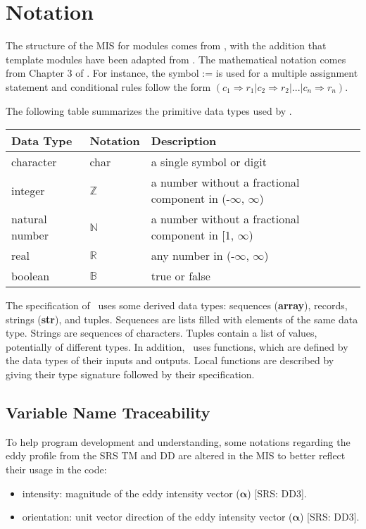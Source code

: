 \documentclass[12pt, titlepage]{article}
\begin{document}
\section{Notation}


The structure of the MIS for modules comes from \citet{HoffmanAndStrooper1995},
with the addition that template modules have been adapted from
\cite{GhezziEtAl2003}.  The mathematical notation comes from Chapter 3 of
\citet{HoffmanAndStrooper1995}.  For instance, the symbol := is used for a
multiple assignment statement and conditional rules follow the form $(c_1
\Rightarrow r_1 | c_2 \Rightarrow r_2 | ... | c_n \Rightarrow r_n )$.

The following table summarizes the primitive data types used by \progname. 

\begin{center}
\renewcommand{\arraystretch}{1.2}
\noindent 
\begin{tabular}{l l p{7.5cm}} 
\toprule 
\textbf{Data Type} & \textbf{Notation} & \textbf{Description}\\ 
\midrule
character & char & a single symbol or digit\\
integer & $\mathbb{Z}$ & a number without a fractional component in (-$\infty$, $\infty$) \\
natural number & $\mathbb{N}$ & a number without a fractional component in [1, $\infty$) \\
real & $\mathbb{R}$ & any number in (-$\infty$, $\infty$)\\
boolean & $\mathbb{B}$ & true or false \\
\bottomrule
\end{tabular} 
\end{center}

\noindent
The specification of \progname \ uses some derived data types: sequences (\textbf{array}), records, strings (\textbf{str}), and
tuples. Sequences are lists filled with elements of the same data type. Strings
are sequences of characters. Tuples contain a list of values, potentially of
different types. In addition, \progname \ uses functions, which
are defined by the data types of their inputs and outputs. Local functions are
described by giving their type signature followed by their specification.

\subsection{Variable Name Traceability}
To help program development and understanding, some notations regarding the eddy profile from the SRS TM and DD are altered in the MIS to better reflect their usage in the code:
\begin{itemize}
  \item intensity: magnitude of the eddy intensity vector ($\boldsymbol{\alpha}$) [SRS: DD3].
  \item orientation: unit vector direction of the eddy intensity vector ($\boldsymbol{\alpha}$) [SRS: DD3].
\end{itemize}
\end{document}
